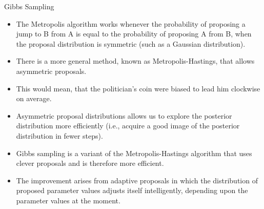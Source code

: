 \documentclass[handout]{beamer}
\begin{document}
\begin{frame}{Gibbs Sampling}
\scriptsize{

\begin{itemize}

\item The Metropolis algorithm works whenever the probability of proposing a jump to B from A is equal to the probability of proposing A from B, when the proposal distribution is symmetric (such as a Gaussian distribution). 

\item There is a more general method, known as Metropolis-Hastings, that allows asymmetric proposals.

\item This would mean, that the politician's coin were biased to lead him clockwise on average.

\item Asymmetric proposal distributions allows us to explore the posterior distribution more efficiently (i.e., acquire a good image of the posterior distribution in fewer steps).

\item Gibbs sampling is a variant of the Metropolis-Hastings algorithm that uses clever proposals and is therefore more efficient.

\item The improvement arises from adaptive proposals in which the distribution of proposed parameter values adjusts itself intelligently, depending upon the parameter values at the moment.


\end{itemize}


} 
\end{frame}
\end{document}
